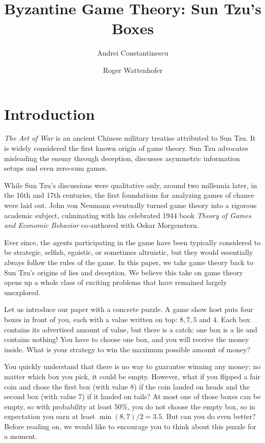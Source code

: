 \documentclass[sigconf,nonacm]{aamas}
\title[Byzantine Game Theory: Sun Tzu's Boxes]{Byzantine Game Theory: Sun Tzu's Boxes}
\author{Andrei Constantinescu}
\affiliation{
  \institution{ETH Zürich}
  \city{Zürich}
  \country{Switzerland}}
\author{Roger Wattenhofer}
\affiliation{
  \institution{ETH Zürich}
  \city{Zürich}
  \country{Switzerland}}
\begin{document}
\pagestyle{fancy}
\fancyhead{}

\maketitle 



\section{Introduction}

\textit{The Art of War} is an ancient Chinese military treatise attributed to Sun Tzu.
It is widely considered the first known origin of game theory. Sun Tzu advocates misleading the enemy through deception, discusses asymmetric information setups and even zero-sum games.

While Sun Tzu's discussions were qualitative only, around two millennia later, in the 16th and 17th centuries, the first foundations for analyzing games of chance were laid out.
John von Neumann eventually turned game theory into a rigorous academic subject,
culminating with his celebrated 1944 book \textit{Theory of Games and Economic Behavior} co-authored with Oskar Morgenstern.

Ever since, the agents participating in the game have been typically considered to be strategic, selfish, egoistic, or sometimes altruistic, but they would essentially always follow the rules of the game. In this paper, we 
take game theory back to Sun Tzu's origins of lies and deception. We believe this take on game theory opens up a whole class of exciting problems that have remained largely unexplored. 

Let us introduce our paper with a concrete puzzle.
A game show host puts four boxes in front of you, each with a value written on top: $8, 7, 5$ and $4$. Each box contains its advertised amount of value, but there is a catch: one box is a lie and contains nothing! You have to choose one box, and you will receive the money inside. 
What is your strategy to win the maximum possible amount of money? 

You 
quickly understand that there is no way to guarantee winning any money:
no matter which box you pick, it could be empty. However, 
what if you flipped a fair coin and chose the first box (with value 8) if the coin landed on heads and the second box (with value 7) if it landed on tails? At most one of those boxes can be empty, so with probability at least 50\%, you do not choose the empty box, so in expectation you earn at least $\min(8,7)/2 = 3.5$.
But can you do even better? Before reading on, we would like to encourage you to think about this puzzle for a moment.
\end{document}
